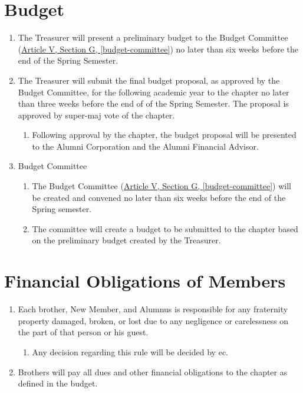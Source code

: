 \section{Budget}
	\label{budget}
	\begin{enumerate}
		\item The Treasurer will present a preliminary budget to the Budget Committee (\hyperref[budget-committee]{Article V, Section G, \autoref*{budget-committee}}) no later than six weeks before the end of the Spring Semester.
		\item The Treasurer will submit the final budget proposal, as approved by the Budget Committee, for the following academic year to the chapter no later than three weeks before the end of of the Spring Semester. The proposal is approved by \gls{super-maj} vote of the chapter.
			\begin{enumerate}
				\item Following approval by the chapter, the budget proposal will be presented to the Alumni Corporation and the Alumni Financial Advisor.
			\end{enumerate}

		\item Budget Committee
			\begin{enumerate}
				\item The Budget Committee (\hyperref[budget-committee]{Article V, Section G, \autoref*{budget-committee}}) will be created and convened no later than six weeks before the end of the Spring semester.
				\item The committee will create a budget to be submitted to the chapter based on the preliminary budget created by the Treasurer.
			\end{enumerate}
	\end{enumerate}

\section{Financial Obligations of Members}
\label{fin-obligations}

	\begin{enumerate}
		\item Each brother, New Member, and Alumnus is responsible for any fraternity property damaged, broken, or lost due to any negligence or carelessness on the part of that person or his guest. 
		\begin{enumerate}
			\item Any decision regarding this rule will be decided by \gls{ec}.
		\end{enumerate}

		\item Brothers will pay all dues and other financial obligations to the chapter as defined in the budget.

	\end{enumerate}

